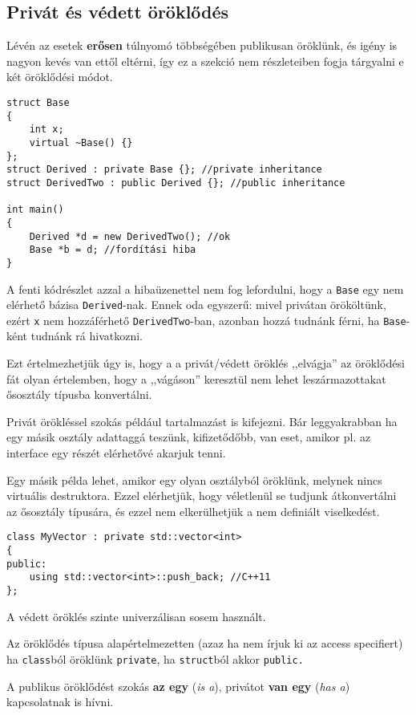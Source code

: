 \documentclass[a4paper,11.5pt,table]{article}
\begin{document}
	\subsection{Privát és védett öröklődés}
	Lévén az esetek \textbf{erősen} túlnyomó többségében publikusan öröklünk, és igény is nagyon kevés van ettől eltérni, így ez a szekció nem részleteiben fogja tárgyalni e két öröklődési módot.
	\begin{lstlisting}
struct Base 
{ 
	int x;
	virtual ~Base() {} 
};
struct Derived : private Base {}; //private inheritance
struct DerivedTwo : public Derived {}; //public inheritance

int main()
{
	Derived *d = new DerivedTwo(); //ok
	Base *b = d; //fordítási hiba
}
	\end{lstlisting}
	A fenti kódrészlet azzal a hibaüzenettel nem fog lefordulni, hogy a \texttt{Base} egy nem elérhető bázisa \texttt{Derived}-nak. Ennek oda egyszerű: mivel privátan örököltünk, ezért \texttt{x} nem hozzáférhető \texttt{DerivedTwo}-ban, azonban hozzá tudnánk férni, ha \texttt{Base}-ként tudnánk rá hivatkozni.
	
	Ezt értelmezhetjük úgy is, hogy a a privát/védett öröklés ,,elvágja'' az öröklődési fát olyan értelemben, hogy a ,,vágáson'' keresztül nem lehet leszármazottakat ősosztály típusba konvertálni.
	\medskip
	
	Privát örökléssel szokás például tartalmazást is kifejezni. Bár leggyakrabban ha egy másik osztály adattaggá teszünk, kifizetődőbb, van eset, amikor pl. az interface egy részét elérhetővé akarjuk tenni.
	
	Egy másik példa lehet, amikor egy olyan osztályból öröklünk, melynek nincs virtuális destruktora. Ezzel elérhetjük, hogy véletlenül se tudjunk átkonvertálni az ősosztály típusára, és ezzel nem elkerülhetjük a nem definiált viselkedést.
	\begin{lstlisting}
class MyVector : private std::vector<int>
{
public:
	using std::vector<int>::push_back; //C++11
};
	\end{lstlisting}
	A védett öröklés szinte univerzálisan sosem használt.
	\begin{note}
		Az öröklődés típusa alapértelmezetten (azaz ha nem írjuk ki az access specifiert) ha \texttt{class}ból öröklünk \texttt{private}, ha \texttt{struct}ból akkor \texttt{public.}
	\end{note}
	\begin{note}
		A publikus öröklődést szokás \textbf{az egy} (\textit{is a}), privátot \textbf{van egy} (\textit{has a}) kapcsolatnak is hívni.
	\end{note}
\end{document}
